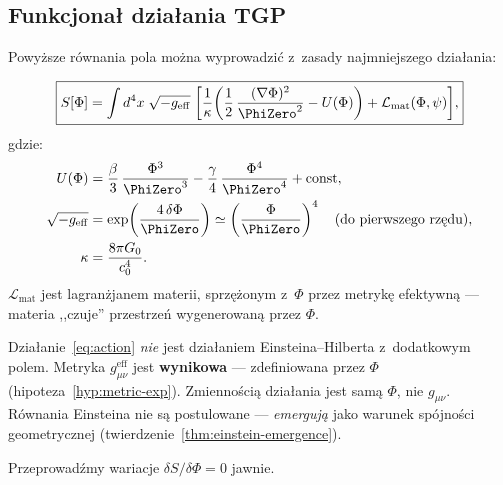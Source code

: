 \subsection{Funkcjona\l{} dzia\l{}ania TGP}\label{ssec:action}

Powy\.zsze r\'ownania pola mo\.zna wyprowadzi\'c z~zasady
najmniejszego dzia\l{}ania:

\begin{hypothesis}\label{hyp:action}
\begin{equation}\label{eq:action}
  \boxed{
    S[\Phi] = \int d^4x\;\sqrt{-g_{\mathrm{eff}}}\;\biggl[
      \frac{1}{\kappa}\biggl(
        \frac{1}{2}\,\frac{(\nabla\Phi)^2}{\PhiZero^2}
        - U(\Phi)
      \biggr)
      + \mathcal{L}_{\mathrm{mat}}(\Phi,\psi)
    \biggr],
  }
\end{equation}
gdzie:
\begin{align}
  U(\Phi) &= \frac{\beta}{3}\,\frac{\Phi^3}{\PhiZero^3}
           - \frac{\gamma}{4}\,\frac{\Phi^4}{\PhiZero^4}
           + \mathrm{const}, \label{eq:U-potential}\\
  \sqrt{-g_{\mathrm{eff}}} &= \exp\!\left(\frac{4\,\delta\Phi}{\PhiZero}
           \right) \simeq \left(\frac{\Phi}{\PhiZero}\right)^4
           \quad\text{(do pierwszego rz\k{e}du),} \\
  \kappa &= \frac{8\pi G_0}{c_0^4}.
\end{align}
$\mathcal{L}_{\mathrm{mat}}$ jest lagran\.zjanem materii,
sprz\k{e}\.zonym z~$\Phi$ przez metryk\k{e} efektywn\k{a} ---
materia ,,czuje'' przestrze\'n wygenerowan\k{a} przez $\Phi$.
\end{hypothesis}

\begin{remark}
Dzia\l{}anie~\eqref{eq:action} \emph{nie} jest dzia\l{}aniem
Einsteina--Hilberta z~dodatkowym polem. Metryka
$g_{\mu\nu}^{\mathrm{eff}}$ jest \textbf{wynikowa} ---
zdefiniowana przez $\Phi$ (hipoteza~\ref{hyp:metric-exp}).
Zmienno\'sci\k{a} dzia\l{}ania jest sam\k{a} $\Phi$, nie $g_{\mu\nu}$.
R\'ownania Einsteina nie s\k{a} postulowane --- \emph{emerguj\k{a}}
jako warunek sp\'ojno\'sci geometrycznej
(twierdzenie~\ref{thm:einstein-emergence}).
\end{remark}

Przeprowad\'zmy wariacje $\delta S/\delta\Phi = 0$ jawnie.

